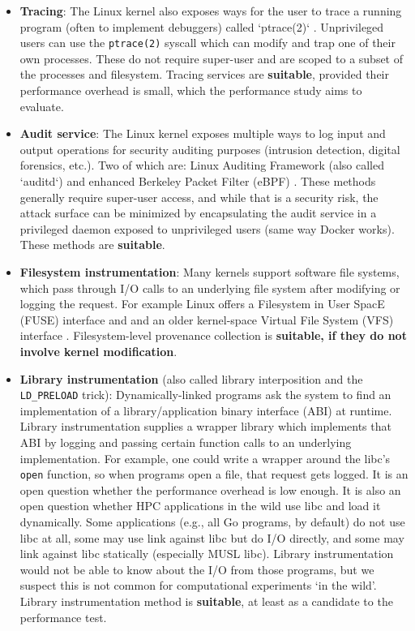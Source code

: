 \begin{itemize}
\item \textbf{Tracing}:
The Linux kernel also exposes ways for the user to trace a running program (often to implement debuggers) called `ptrace(2)` \cite{noauthor_ptrace_nodate}.
Unprivileged users can use the \texttt{ptrace(2)} syscall \cite{noauthor_ptrace_nodate} which can modify and trap one of their own processes.
These do not require super-user and are scoped to a subset of the processes and filesystem.
Tracing services are \textbf{suitable}, provided their performance overhead is small, which the performance study aims to evaluate.

\item \textbf{Audit service}:
The Linux kernel exposes multiple ways to log input and output operations for security auditing purposes (intrusion detection, digital forensics, etc.).
Two of which are: Linux Auditing Framework (also called `auditd`) and enhanced Berkeley Packet Filter (eBPF) \cite{noauthor_bpf_nodate}.
These methods generally require super-user access, and while that is a security risk, the attack surface can be minimized by encapsulating the audit service in a privileged daemon exposed to unprivileged users (same way Docker works).
These methods are \textbf{suitable}.

\item \textbf{Filesystem instrumentation}:
Many kernels support software file systems, which pass through I/O calls to an underlying file system after modifying or logging the request.
For example Linux offers a Filesystem in User SpacE (FUSE) interface \cite{noauthor_fuse_nodate} and and an older kernel-space Virtual File System (VFS) interface \cite{gooch_overview_nodate}.
Filesystem-level provenance collection is \textbf{suitable, if they do not involve kernel modification}.

\item \textbf{Library instrumentation} (also called library interposition and the \texttt{LD\_PRELOAD} trick):
Dynamically-linked programs ask the system to find an implementation of a library/application binary interface (ABI) at runtime.
Library instrumentation supplies a wrapper library which implements that ABI by logging and passing certain function calls to an underlying implementation.
For example, one could write a wrapper around the libc's \texttt{open} function, so when programs open a file, that request gets logged.
It is an open question whether the performance overhead is low enough.
It is also an open question whether HPC applications in the wild use libc and load it dynamically.
Some applications (e.g., all Go programs, by default) do not use libc at all, some may use link against libc but do I/O directly, and some may link against libc statically (especially MUSL libc).
Library instrumentation would not be able to know about the I/O from those programs, but we suspect this is not common for computational experiments `in the wild'.
Library instrumentation method is \textbf{suitable}, at least as a candidate to the performance test.


\end{itemize}
